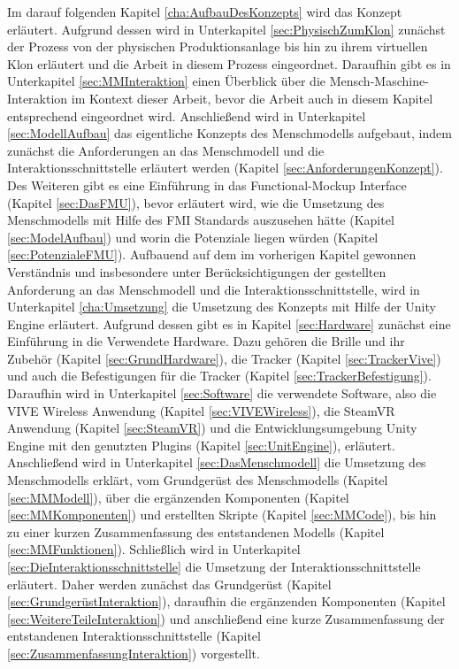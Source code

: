 \newline
Im darauf folgenden Kapitel \ref{cha:AufbauDesKonzepts} wird das Konzept erläutert. Aufgrund dessen wird in Unterkapitel \ref{sec:PhysischZumKlon} zunächst der Prozess von der physischen Produktionsanlage bis hin zu ihrem virtuellen Klon erläutert und die Arbeit in diesem Prozess eingeordnet. Daraufhin gibt es in Unterkapitel \ref{sec:MMInteraktion} einen Überblick über die Mensch-Maschine-Interaktion im Kontext dieser Arbeit, bevor die Arbeit auch in diesem Kapitel entsprechend eingeordnet wird. Anschließend wird in Unterkapitel \ref{sec:ModellAufbau} das eigentliche Konzepts des Menschmodells aufgebaut, indem zunächst die Anforderungen an das Menschmodell und die Interaktionsschnittstelle erläutert werden (Kapitel \ref{sec:AnforderungenKonzept}). Des Weiteren gibt es eine Einführung in das Functional-Mockup Interface (Kapitel \ref{sec:DasFMU}), bevor erläutert wird, wie die Umsetzung des Menschmodells mit Hilfe des FMI Standards auszusehen hätte (Kapitel \ref{sec:ModelAufbau}) und worin die Potenziale liegen würden (Kapitel \ref{sec:PotenzialeFMU}).
\newline
Aufbauend auf dem im vorherigen Kapitel gewonnen Verständnis und insbesondere unter Berücksichtigungen der gestellten Anforderung an das Menschmodell und die Interaktionsschnittstelle, wird in Unterkapitel \ref{cha:Umsetzung} die Umsetzung des Konzepts mit Hilfe der Unity Engine erläutert. Aufgrund dessen gibt es in Kapitel \ref{sec:Hardware} zunächst eine Einführung in die Verwendete Hardware. Dazu gehören die Brille und ihr Zubehör (Kapitel \ref{sec:GrundHardware}), die Tracker (Kapitel \ref{sec:TrackerVive}) und auch die Befestigungen für die Tracker (Kapitel \ref{sec:TrackerBefestigung}). Daraufhin wird in Unterkapitel \ref{sec:Software} die verwendete Software, also die VIVE Wireless Anwendung (Kapitel \ref{sec:VIVEWireless}), die SteamVR Anwendung (Kapitel \ref{sec:SteamVR}) und die Entwicklungsumgebung Unity Engine mit den genutzten Plugins (Kapitel \ref{sec:UnitEngine}), erläutert. Anschließend wird in Unterkapitel \ref{sec:DasMenschmodell} die Umsetzung des Menschmodells erklärt, vom Grundgerüst des Menschmodells (Kapitel \ref{sec:MMModell}), über die ergänzenden Komponenten (Kapitel \ref{sec:MMKomponenten}) und erstellten Skripte (Kapitel \ref{sec:MMCode}), bis hin zu einer kurzen Zusammenfassung des entstandenen Modells (Kapitel \ref{sec:MMFunktionen}). Schließlich wird in Unterkapitel \ref{sec:DieInteraktionsschnittstelle} die Umsetzung der Interaktionsschnittstelle erläutert. Daher werden zunächst das Grundgerüst (Kapitel \ref{sec:GrundgerüstInteraktion}), daraufhin die ergänzenden Komponenten (Kapitel \ref{sec:WeitereTeileInteraktion}) und anschließend eine kurze Zusammenfassung der entstandenen Interaktionsschnittstelle (Kapitel \ref{sec:ZusammenfassungInteraktion}) vorgestellt.
